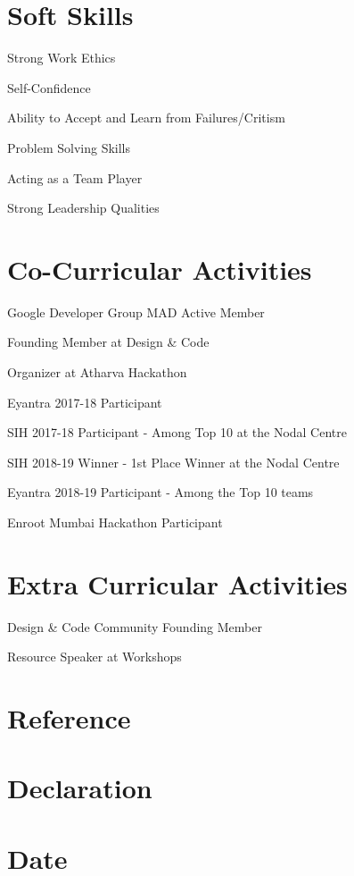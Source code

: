 \documentclass[11pt]{article}
\begin{document}
\section{Soft Skills}
\begin{description} 
\item{Strong Work Ethics}
\item {Self-Confidence}
\item {Ability to Accept and Learn from Failures/Critism}
\item {Problem Solving Skills}
\item {Acting as a Team Player}
\item {Strong Leadership Qualities}
\end{description}

\section{Co-Curricular Activities}
\begin{description}
\item {Google Developer Group MAD Active Member}
\item {Founding Member at Design \& Code}
\item {Organizer at Atharva Hackathon}
\item {Eyantra 2017-18 Participant}
\item {SIH 2017-18 Participant - Among Top 10 at the Nodal Centre}
\item {SIH 2018-19 Winner - 1st Place Winner at the Nodal Centre}
\item {Eyantra 2018-19 Participant - Among the Top 10 teams}
\item {Enroot Mumbai Hackathon Participant}
\end{description}
\section{Extra Curricular Activities}
\begin{description}
\item {Design \& Code Community Founding Member}
\item {Resource Speaker at Workshops}
\end{description}
\section{Reference}
\section{Declaration}
\section{Date}
\end{document}
